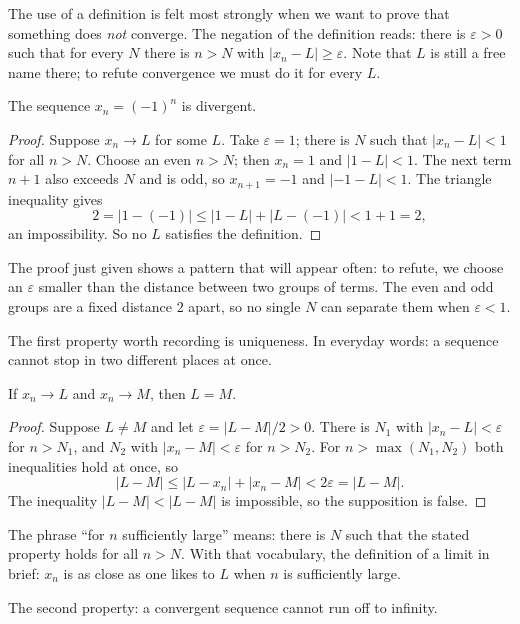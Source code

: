 The use of a definition is felt most strongly when we want to prove that something
does \emph{not} converge. The negation of the definition reads: there is
$\varepsilon>0$ such that for every $N$ there is $n>N$ with $|x_n-L| \ge
\varepsilon$. Note that $L$ is still a free name there; to refute convergence we
must do it for every $L$.

\begin{contoh}
The sequence $x_n=(-1)^n$ is divergent.
\end{contoh}

\begin{proof}
Suppose $x_n \to L$ for some $L$. Take $\varepsilon=1$; there is $N$ such that
$|x_n-L|<1$ for all $n>N$. Choose an even $n>N$; then $x_n=1$ and $|1-L|<1$. The
next term $n+1$ also exceeds $N$ and is odd, so $x_{n+1}=-1$ and $|-1-L|<1$. The
triangle inequality gives
\[
2 = |1-(-1)| \le |1-L| + |L-(-1)| < 1+1 = 2,
\]
an impossibility. So no $L$ satisfies the definition.
\end{proof}

The proof just given shows a pattern that will appear often: to refute, we choose an
$\varepsilon$ smaller than the distance between two groups of terms. The even and
odd groups are a fixed distance $2$ apart, so no single $N$ can separate them when
$\varepsilon<1$.

The first property worth recording is uniqueness. In everyday words: a sequence
cannot stop in two different places at once.

\begin{teorema}
If $x_n \to L$ and $x_n \to M$, then $L=M$.
\end{teorema}

\begin{proof}
Suppose $L \neq M$ and let $\varepsilon=|L-M|/2>0$. There is $N_1$ with
$|x_n-L|<\varepsilon$ for $n>N_1$, and $N_2$ with $|x_n-M|<\varepsilon$ for
$n>N_2$. For $n>\max(N_1,N_2)$ both inequalities hold at once, so
\[
|L-M| \le |L-x_n| + |x_n-M| < 2\varepsilon = |L-M| .
\]
The inequality $|L-M|<|L-M|$ is impossible, so the supposition is false.
\end{proof}

The phrase ``for $n$ sufficiently large'' means: there is $N$ such that the stated
property holds for all $n>N$. With that vocabulary, the definition of a limit in
brief: $x_n$ is as close as one likes to $L$ when $n$ is sufficiently large.

The second property: a convergent sequence cannot run off to infinity.

